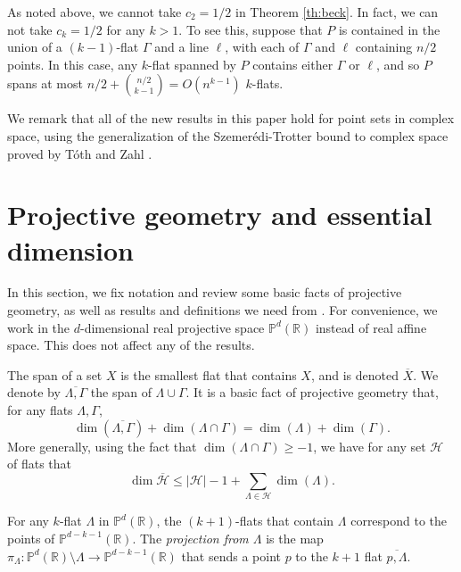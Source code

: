 \documentclass{article}
\begin{document}
As noted above, we cannot take $c_2 = 1/2$ in Theorem \ref{th:beck}.
In fact, we can not take $c_k = 1/2$ for any $k>1$.
To see this, suppose that $P$ is contained in the union of a $(k-1)$-flat $\Gamma$ and a line $\ell$, with each of $\Gamma$ and $\ell$ containing $n/2$ points.
In this case, any $k$-flat spanned by $P$ contains either $\Gamma$ or $\ell$, and so $P$ spans at most $n/2 + \binom{n/2}{k-1} = O(n^{k-1})$ $k$-flats.

We remark that all of the new results in this paper hold for point sets in complex space, using the generalization of the Szemer\'edi-Trotter bound to complex space proved by T\'oth \cite{toth2015szemeredi} and Zahl \cite{zahl2012szemeredi}.


\section{Projective geometry and essential dimension}


In this section, we fix notation and review some basic facts of projective geometry, as well as results and definitions we need from \cite{lund2016essential}.
For convenience, we work in the $d$-dimensional real projective space $\mathbb{P}^d(\mathbb{R})$ instead of real affine space.
This does not affect any of the results.

The span of a set $X $ is the smallest flat that contains $X$, and is denoted $\overline{X}$.
We denote by $\overline{\Lambda,\Gamma}$ the span of $\Lambda \cup \Gamma$.
It is a basic fact of projective geometry that, for any flats $\Lambda, \Gamma$,
\begin{equation}\label{eqn:dimSpan} \dim(\overline{\Lambda,\Gamma})  + \dim(\Lambda \cap \Gamma) = \dim(\Lambda) + \dim(\Gamma).\end{equation}
More generally, using the fact that $\dim(\Lambda \cap \Gamma) \geq -1$, we have for any set $\mathcal{H}$ of flats that
\begin{equation}\label{eqn:dimSpanManyFlats}\dim \overline{\mathcal{H}} \leq |\mathcal{H}| - 1 +\sum_{\Lambda \in \mathcal{H}} \dim(\Lambda).\end{equation}

For any $k$-flat $\Lambda$ in $\mathbb{P}^d(\mathbb{R})$, the $(k+1)$-flats that contain $\Lambda$ correspond to the points of $\mathbb{P}^{d-k-1}(\mathbb{R})$.
The {\em projection from $\Lambda$} is the map $\pi_\Lambda: \mathbb{P}^d(\mathbb{R}) \setminus \Lambda \rightarrow \mathbb{P}^{d-k-1}(\mathbb{R})$ that sends a point $p$ to the $k+1$ flat $\overline{p,\Lambda}$.
\end{document}
